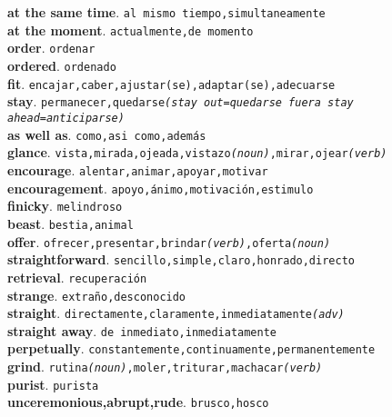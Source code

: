 \documentclass[twocolumn]{article}
\begin{document}
	\textsf{\textbf{at the same time}}. \texttt{al mismo tiempo,simultaneamente}\\
	\textsf{\textbf{at the moment}}. \texttt{actualmente,de momento}\\
	\textsf{\textbf{order}}. \texttt{ordenar}\\
	\textsf{\textbf{ordered}}. \texttt{ordenado}\\
	\textsf{\textbf{fit}}. \texttt{encajar,caber,ajustar(se),adaptar(se),adecuarse}\\
	\textsf{\textbf{stay}}. \texttt{permanecer,quedarse{\scriptsize \textsl{(stay out=quedarse fuera stay ahead=anticiparse)}}}\\
	\textsf{\textbf{as well as}}. \texttt{como,asi como,adem\'as}\\
	\textsf{\textbf{glance}}. \texttt{vista,mirada,ojeada,vistazo{\scriptsize \textsl{(noun)}},mirar,ojear{\scriptsize \textsl{(verb)}}}\\
	\textsf{\textbf{encourage}}. \texttt{alentar,animar,apoyar,motivar}\\
	\textsf{\textbf{encouragement}}. \texttt{apoyo,\'animo,motivaci\'on,estimulo}\\
	\textsf{\textbf{finicky}}. \texttt{melindroso}\\
	\textsf{\textbf{beast}}. \texttt{bestia,animal}\\
	\textsf{\textbf{offer}}. \texttt{ofrecer,presentar,brindar{\scriptsize \textsl{(verb)}},oferta{\scriptsize \textsl{(noun)}}}\\
	\textsf{\textbf{straightforward}}. \texttt{sencillo,simple,claro,honrado,directo}\\
	\textsf{\textbf{retrieval}}. \texttt{recuperaci\'on}\\
	\textsf{\textbf{strange}}. \texttt{extra\~no,desconocido}\\
	\textsf{\textbf{straight}}. \texttt{directamente,claramente,inmediatamente{\scriptsize \textsl{(adv)}}}\\
	\textsf{\textbf{straight away}}. \texttt{de inmediato,inmediatamente}\\
	\textsf{\textbf{perpetually}}. \texttt{constantemente,continuamente,permanentemente}\\
	\textsf{\textbf{grind}}. \texttt{rutina{\scriptsize \textsl{(noun)}},moler,triturar,machacar{\scriptsize \textsl{(verb)}}}\\
	\textsf{\textbf{purist}}. \texttt{purista}\\
	\textsf{\textbf{unceremonious,abrupt,rude}}. \texttt{brusco,hosco}\\
\end{document}
